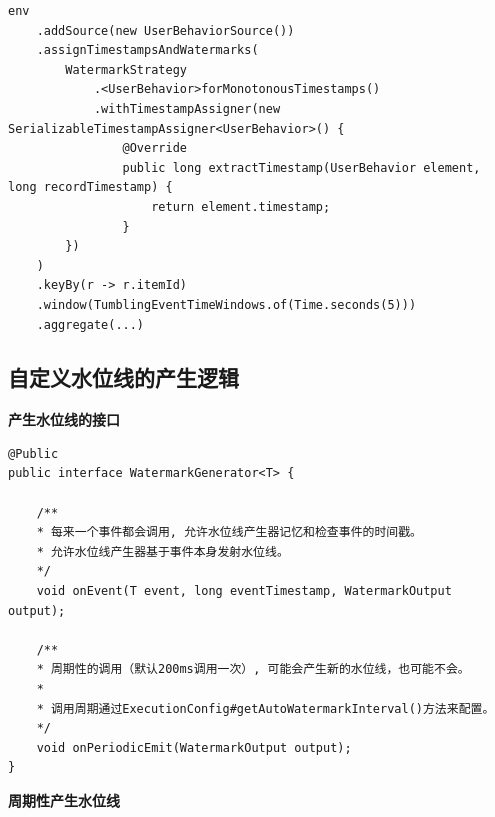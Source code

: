 \documentclass[cn,11pt,chinese]{elegantbook}
\begin{document}
\begin{verbatim}
env
    .addSource(new UserBehaviorSource())
    .assignTimestampsAndWatermarks(
        WatermarkStrategy
            .<UserBehavior>forMonotonousTimestamps()
            .withTimestampAssigner(new SerializableTimestampAssigner<UserBehavior>() {
                @Override
                public long extractTimestamp(UserBehavior element, long recordTimestamp) {
                    return element.timestamp;
                }
        })
    )
    .keyBy(r -> r.itemId)
    .window(TumblingEventTimeWindows.of(Time.seconds(5)))
    .aggregate(...)
\end{verbatim}

\subsection{自定义水位线的产生逻辑}

\textbf{产生水位线的接口}

\begin{verbatim}
@Public
public interface WatermarkGenerator<T> {
    
    /**
    * 每来一个事件都会调用, 允许水位线产生器记忆和检查事件的时间戳。
    * 允许水位线产生器基于事件本身发射水位线。
    */
    void onEvent(T event, long eventTimestamp, WatermarkOutput output);
    
    /**
    * 周期性的调用（默认200ms调用一次）, 可能会产生新的水位线，也可能不会。
    *
    * 调用周期通过ExecutionConfig#getAutoWatermarkInterval()方法来配置。
    */
    void onPeriodicEmit(WatermarkOutput output);
}
\end{verbatim}

\textbf{周期性产生水位线}
\end{document}
